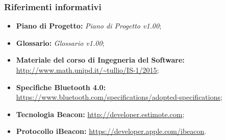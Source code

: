 \documentclass[../StudioDiFattibilita.tex]{subfiles}
\begin{document}
		\subsubsection{Riferimenti informativi}
		\begin{itemize}
			\item \textbf{Piano di Progetto:} \textit{Piano di Progetto v1.00};
			\item \textbf{Glossario:} \textit{Glossario v1.00};
			\item \textbf{Materiale del corso di Ingegneria del Software:}\\\url{http://www.math.unipd.it/~tullio/IS-1/2015};
			\item \textbf{Specifiche Bluetooth 4.0:}\\\url{https://www.bluetooth.com/specifications/adopted-specifications};
			\item \textbf{Tecnologia Beacon:} \url{http://developer.estimote.com};
			\item \textbf{Protocollo iBeacon:} \url{https://developer.apple.com/ibeacon}.
		\end{itemize}
\end{document}
